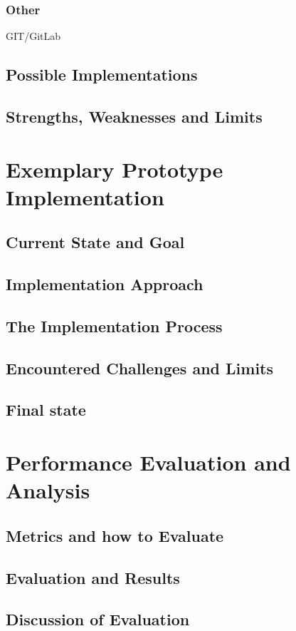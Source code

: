 \documentclass[12pt, a4paper]{article}
\begin{document}
    \subsubsection{Other}
    GIT/GitLab
    \subsection{Possible Implementations}
    \subsection{Strengths, Weaknesses and Limits}

\section{Exemplary Prototype Implementation}\label{sec::solution_code}
    
    \subsection{Current State and Goal}
    \subsection{Implementation Approach}
    \subsection{The Implementation Process}
    \subsection{Encountered Challenges and Limits}
    \subsection{Final state}

\section{Performance Evaluation and Analysis}\label{sec::eval}
\subsection{Metrics and how to Evaluate}
    \subsection{Evaluation and Results}
    \subsection{Discussion of Evaluation}
\end{document}
